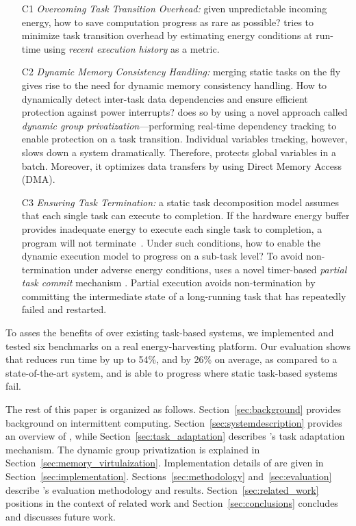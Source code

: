 \begin{itemize}

\item[C1] \emph{Overcoming Task Transition Overhead:} given unpredictable incoming energy, how to save computation progress as rare as possible? \sys tries to minimize task transition overhead by estimating energy conditions at run-time using \emph{recent execution history} as a metric.

\item[C2] \emph{Dynamic Memory Consistency Handling:} merging static tasks on the fly gives rise to the need for dynamic memory consistency handling. How to dynamically detect inter-task data dependencies and ensure efficient protection against power interrupts? \sys does so by using a novel approach called \emph{dynamic group privatization}---performing real-time dependency tracking to enable protection on a task transition. Individual variables tracking, however, slows down a system dramatically. Therefore, \sys protects global variables in a batch. Moreover, it optimizes data transfers by using Direct Memory Access (DMA).

\item[C3] \emph{Ensuring Task Termination:} a static task decomposition model assumes that each single task can execute to completion. If the hardware energy buffer provides inadequate energy to execute each single task to completion, a program will not terminate~\cite{cleancut_2018}. Under such conditions, how to enable the dynamic execution model to progress on a sub-task level? To avoid non-termination under adverse energy conditions, \sys uses a novel timer-based {\em partial task commit} mechanism . Partial execution avoids non-termination by committing the intermediate state of a long-running task that has repeatedly failed and restarted.

\end{itemize}

To asses the benefits of \sys over existing task-based systems, we implemented and tested six benchmarks on a real energy-harvesting platform. Our evaluation shows that \sys reduces run time by up to 54\%, and by 26\% on average, as compared to a state-of-the-art system, and is able to progress where static task-based systems fail.
 
The rest of this paper is organized as follows. Section~\ref{sec:background} provides background on intermittent computing.
Section~\ref{sec:systemdescription} provides an overview of \sys, while Section~\ref{sec:task_adaptation} describes \sys's task adaptation mechanism. The dynamic group privatization is explained in Section~\ref{sec:memory_virtulaization}. Implementation details of \sys are given in Section~\ref{sec:implementation}. Sections~\ref{sec:methodology} and~\ref{sec:evaluation} describe \sys's evaluation methodology and results. Section~\ref{sec:related_work} positions \sys in the context of related work and Section~\ref{sec:conclusions} concludes and discusses future work.